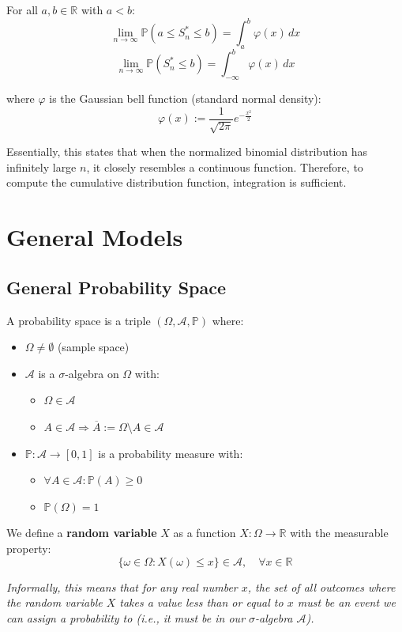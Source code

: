 \documentclass{article}
\begin{document}
For all $a,b \in \mathbb{R}$ with $a < b$:
\[\lim_{n\to\infty}\mathbb{P}(a \leq S^*_n \leq b) = \int_{a}^{b} \varphi(x)\,dx\]
\[\lim_{n\to\infty}\mathbb{P}(S^*_n \leq b) = \int_{-\infty}^{b} \varphi(x)\,dx\]

where $\varphi$ is the Gaussian bell function (standard normal density):
\[\varphi(x) := \frac{1}{\sqrt{2\pi}}e^{-\frac{x^2}{2}}\]

Essentially, this states that when the normalized binomial distribution has infinitely large $n$, it closely resembles a continuous function. Therefore, to compute the cumulative distribution function, integration is sufficient.

\section{General Models}

\subsection{General Probability Space}
A probability space is a triple $(\Omega, \mathcal{A}, \mathbb{P})$ where:
\begin{itemize}
    \item $\Omega \neq \emptyset$ (sample space)
    \item $\mathcal{A}$ is a $\sigma$-algebra on $\Omega$ with:
    \begin{itemize}
        \item $\Omega \in \mathcal{A}$
        \item $A \in \mathcal{A} \Rightarrow \overline{A} := \Omega \setminus A \in \mathcal{A}$
    \end{itemize}
    \item $\mathbb{P}:\mathcal{A} \to [0,1]$ is a probability measure with:
    \begin{itemize}
        \item $\forall A \in \mathcal{A} : \mathbb{P}(A) \geq 0$
        \item $\mathbb{P}(\Omega) = 1$
    \end{itemize}
\end{itemize}

We define a \textbf{random variable} $X$ as a function $X: \Omega \to \mathbb{R}$ with the measurable property:
\[\{\omega \in \Omega : X(\omega) \leq x\} \in \mathcal{A}, \quad \forall x \in \mathbb{R}\]

\textit{Informally, this means that for any real number $x$, the set of all outcomes where the random variable $X$ takes a value less than or equal to $x$ must be an event we can assign a probability to (i.e., it must be in our $\sigma$-algebra $\mathcal{A}$).}
\end{document}
